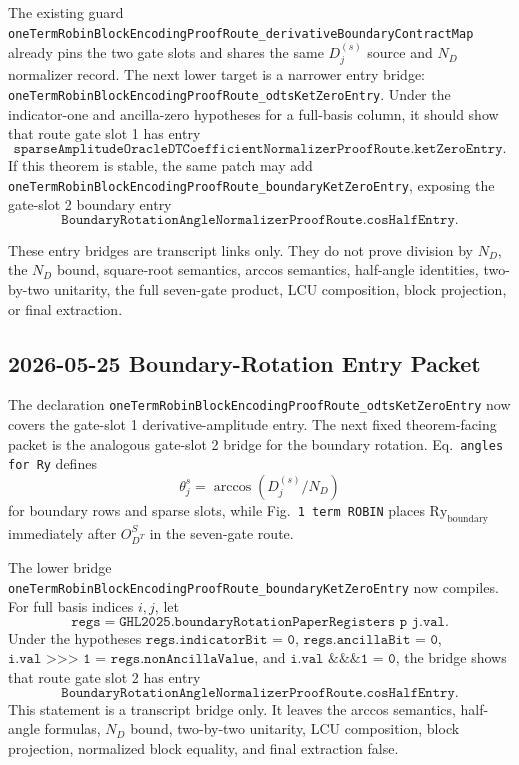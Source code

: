 The existing guard
\texttt{oneTermRobinBlockEncodingProofRoute\_derivativeBoundaryContractMap}
already pins the two gate slots and shares the same \(D_j^{(s)}\) source and
\(N_D\) normalizer record.  The next lower target is a narrower entry bridge:
\texttt{oneTermRobinBlockEncodingProofRoute\_odtsKetZeroEntry}.  Under the
indicator-one and ancilla-zero hypotheses for a full-basis column, it should
show that route gate slot 1 has entry
\[
  \texttt{sparseAmplitudeOracleDTCoefficientNormalizerProofRoute.ketZeroEntry}.
\]
If this theorem is stable, the same patch may add
\texttt{oneTermRobinBlockEncodingProofRoute\_boundaryKetZeroEntry}, exposing
the gate-slot 2 boundary entry
\[
  \texttt{BoundaryRotationAngleNormalizerProofRoute.cosHalfEntry}.
\]

These entry bridges are transcript links only.  They do not prove division by
\(N_D\), the \(N_D\) bound, square-root semantics, arccos semantics,
half-angle identities, two-by-two unitarity, the full seven-gate product, LCU
composition, block projection, or final extraction.

\subsection{2026-05-25 Boundary-Rotation Entry Packet}

The declaration
\texttt{oneTermRobinBlockEncodingProofRoute\_odtsKetZeroEntry} now covers the
gate-slot 1 derivative-amplitude entry.  The next fixed theorem-facing packet
is the analogous gate-slot 2 bridge for the boundary rotation.  Eq.~\texttt{angles for Ry} defines
\[
  \theta_j^s = \arccos(D_j^{(s)}/N_D)
\]
for boundary rows and sparse slots, while Fig.~\texttt{1 term ROBIN} places
\(\mathrm{Ry}_{\mathrm{boundary}}\) immediately after \(O_{D^T}^{S}\) in the
seven-gate route.

The lower bridge
\texttt{oneTermRobinBlockEncodingProofRoute\_boundaryKetZeroEntry} now compiles.
For full basis indices \(i,j\), let
\[
  \texttt{regs}
  =
  \texttt{GHL2025.boundaryRotationPaperRegisters p j.val}.
\]
Under the hypotheses
\(\texttt{regs.indicatorBit = 0}\),
\(\texttt{regs.ancillaBit = 0}\),
\(\texttt{i.val >>> 1 = regs.nonAncillaValue}\), and
\(\texttt{i.val \&\&\& 1 = 0}\), the bridge shows that route gate slot
2 has entry
\[
  \texttt{BoundaryRotationAngleNormalizerProofRoute.cosHalfEntry}.
\]
This statement is a transcript bridge only.  It leaves the arccos semantics,
half-angle formulas, \(N_D\) bound, two-by-two unitarity, LCU composition,
block projection, normalized block equality, and final extraction false.

